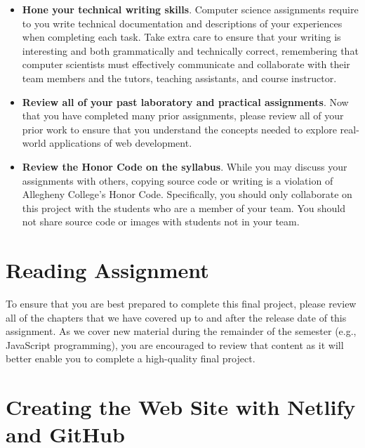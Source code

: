 \documentclass[11pt]{article}
\begin{document}
\begin{itemize}
\item {\bf Hone your technical writing skills}. Computer science assignments
  require to you write technical documentation and descriptions of your
  experiences when completing each task. Take extra care to ensure that your
  writing is interesting and both grammatically and technically correct,
  remembering that computer scientists must effectively communicate and
  collaborate with their team members and the tutors, teaching assistants, and
  course instructor.

\item {\bf Review all of your past laboratory and practical assignments}. Now
  that you have completed many prior assignments, please review all of your
  prior work to ensure that you understand the concepts needed to explore
  real-world applications of web development.

\item {\bf Review the Honor Code on the syllabus}. While you may discuss your
  assignments with others, copying source code or writing is a violation of
  Allegheny College's Honor Code. Specifically, you should only collaborate on
  this project with the students who are a member of your team. You should not
  share source code or images with students not in your team.

\end{itemize}

\vspace*{-.15in}

\section*{Reading Assignment}

To ensure that you are best prepared to complete this final project, please
review all of the chapters that we have covered up to and after the release date
of this assignment. As we cover new material during the remainder of the
semester (e.g., JavaScript programming), you are encouraged to review that
content as it will better enable you to complete a high-quality final project.

\section*{Creating the Web Site with Netlify and GitHub}
\end{document}
